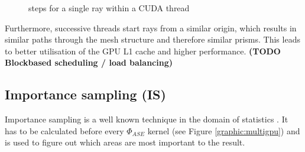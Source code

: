\begin{figure}[H]
  \centerline
  {}
  \caption{steps for a single ray within a CUDA thread}
  \label{graphic:algorithm_steps}
\end{figure}

    Furthermore, successive threads start rays from a similar origin, which
    results in similar paths through the mesh structure and therefore similar
    prisms. This leads to better utilisation of the GPU L1 cache and higher
    performance.
    \textbf{(TODO Blockbased scheduling / load balancing)}
    

\subsection{Importance sampling (IS)}
\label{subsec:importance_sampling}
Importance sampling is a well known technique in the domain
of statistics \cite{importanceSamplingSource}. It has to be calculated 
before every  $\Phi_{ASE}$ kernel (see Figure \ref{graphic:multigpu}) and is used 
to figure out which areas are most important to the result.

